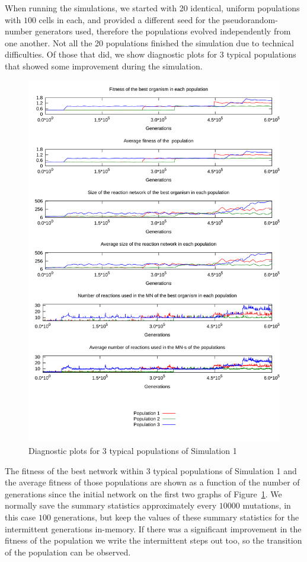 \documentclass[a4paper,12pt]{article}
\begin{document}
When running the simulations, we started with 20 identical, uniform populations with $100$ cells in each, and provided a different seed for the pseudorandom-number generators used, therefore the populations evolved independently from one another. Not all the 20 populations finished the simulation due to technical difficulties. Of those that did, we show diagnostic plots for 3 typical populations that showed some improvement during the simulation.




\begin{figure}[htpb]
	\centering
	\includegraphics[width=0.8\linewidth]{simulation1.pdf}
	\caption{Diagnostic plots for 3 typical populations of Simulation 1}
	\label{fig:simulation1}
\end{figure}


The fitness of the best network within $3$ typical populations of Simulation 1 and the average fitness of those populations are shown as a function of the number of generations since the initial network on the first two graphs of Figure~\ref{fig:simulation1}. We normally save the summary statistics approximately every $10000$ mutations, in this case $100$ generations, but keep the values of these summary statistics for the intermittent generations in-memory. If there was a significant improvement in the fitness of the population we write the intermittent steps out too, so the transition of the population can be observed. 
\end{document}
